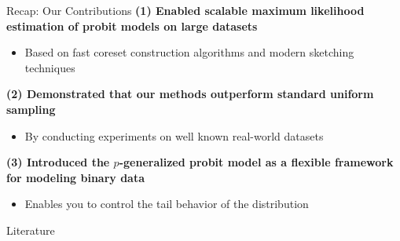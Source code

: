 \documentclass[gray]{beamer}
\begin{document}
\begin{frame}{Recap: Our Contributions}
    \textbf{(1) Enabled scalable maximum likelihood estimation of
        probit models on large datasets}
    \begin{itemize}
        \item Based on fast coreset construction algorithms and modern sketching techniques
    \end{itemize}

    \vspace{\fill}

    \textbf{(2) Demonstrated that our methods outperform standard
        uniform sampling}
    \begin{itemize}
        \item By conducting experiments on well known real-world datasets
    \end{itemize}

    \vspace{\fill}

    \textbf{(3) Introduced the $p$-generalized probit model as a
        flexible framework for modeling binary data}
    \begin{itemize}
        \item Enables you to control the tail behavior of the distribution
    \end{itemize}
\end{frame}


\begin{frame}{Literature}
    
    
\end{frame}
\end{document}
